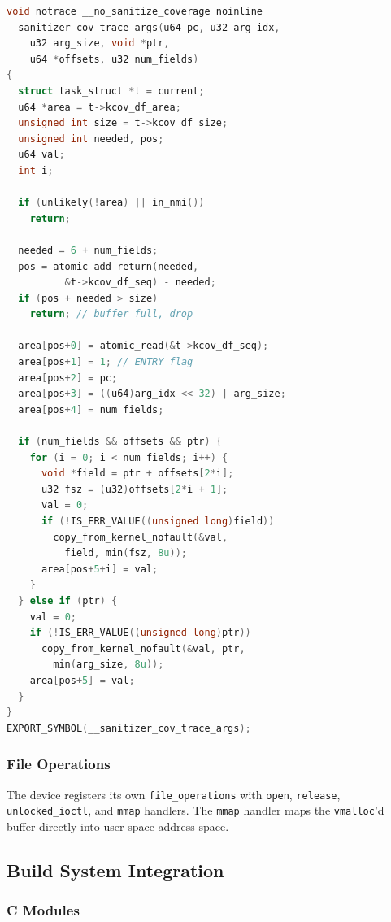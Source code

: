 \documentclass{ndss}
\begin{document}
\begin{lstlisting}[language=C,caption={Kernel trace\_args callback (simplified).}]
void notrace __no_sanitize_coverage noinline
__sanitizer_cov_trace_args(u64 pc, u32 arg_idx,
    u32 arg_size, void *ptr,
    u64 *offsets, u32 num_fields)
{
  struct task_struct *t = current;
  u64 *area = t->kcov_df_area;
  unsigned int size = t->kcov_df_size;
  unsigned int needed, pos;
  u64 val;
  int i;

  if (unlikely(!area) || in_nmi())
    return;

  needed = 6 + num_fields;
  pos = atomic_add_return(needed,
          &t->kcov_df_seq) - needed;
  if (pos + needed > size)
    return; // buffer full, drop

  area[pos+0] = atomic_read(&t->kcov_df_seq);
  area[pos+1] = 1; // ENTRY flag
  area[pos+2] = pc;
  area[pos+3] = ((u64)arg_idx << 32) | arg_size;
  area[pos+4] = num_fields;

  if (num_fields && offsets && ptr) {
    for (i = 0; i < num_fields; i++) {
      void *field = ptr + offsets[2*i];
      u32 fsz = (u32)offsets[2*i + 1];
      val = 0;
      if (!IS_ERR_VALUE((unsigned long)field))
        copy_from_kernel_nofault(&val,
          field, min(fsz, 8u));
      area[pos+5+i] = val;
    }
  } else if (ptr) {
    val = 0;
    if (!IS_ERR_VALUE((unsigned long)ptr))
      copy_from_kernel_nofault(&val, ptr,
        min(arg_size, 8u));
    area[pos+5] = val;
  }
}
EXPORT_SYMBOL(__sanitizer_cov_trace_args);
\end{lstlisting}

\subsubsection{File Operations}

The device registers its own \texttt{file\_operations} with \texttt{open},
\texttt{release}, \texttt{unlocked\_ioctl}, and \texttt{mmap} handlers. The
\texttt{mmap} handler maps the \texttt{vmalloc}'d buffer directly into
user-space address space.

\subsection{Build System Integration}

\subsubsection{C Modules}
\end{document}
